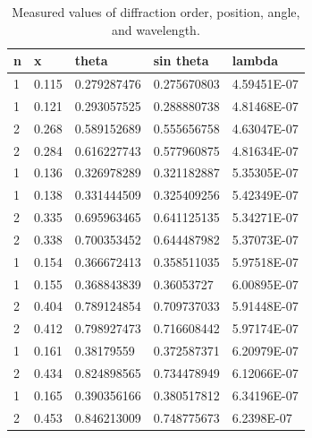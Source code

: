 \documentclass[12pt,a4paper]{article}
\begin{document}
\begin{table}[H]
    \centering
    \begin{tabular}{lllll}
    \hline
        n & x & theta & sin theta & lambda \\ \hline
        1 & 0.115 & 0.279287476 & 0.275670803 & 4.59451E-07 \\ 
        1 & 0.121 & 0.293057525 & 0.288880738 & 4.81468E-07 \\ 
        2 & 0.268 & 0.589152689 & 0.555656758 & 4.63047E-07 \\ 
        2 & 0.284 & 0.616227743 & 0.577960875 & 4.81634E-07 \\ 
        1 & 0.136 & 0.326978289 & 0.321182887 & 5.35305E-07 \\ 
        1 & 0.138 & 0.331444509 & 0.325409256 & 5.42349E-07 \\ 
        2 & 0.335 & 0.695963465 & 0.641125135 & 5.34271E-07 \\ 
        2 & 0.338 & 0.700353452 & 0.644487982 & 5.37073E-07 \\ 
        1 & 0.154 & 0.366672413 & 0.358511035 & 5.97518E-07 \\ 
        1 & 0.155 & 0.368843839 & 0.36053727 & 6.00895E-07 \\ 
        2 & 0.404 & 0.789124854 & 0.709737033 & 5.91448E-07 \\ 
        2 & 0.412 & 0.798927473 & 0.716608442 & 5.97174E-07 \\ 
        1 & 0.161 & 0.38179559 & 0.372587371 & 6.20979E-07 \\ 
        2 & 0.434 & 0.824898565 & 0.734478949 & 6.12066E-07 \\ 
        1 & 0.165 & 0.390356166 & 0.380517812 & 6.34196E-07 \\ 
        2 & 0.453 & 0.846213009 & 0.748775673 & 6.2398E-07 \\ \hline
    \end{tabular}
    \caption{Measured values of diffraction order, position, angle, and wavelength.}
    \label{tab:diffraction_data}
\end{table}
\end{document}
